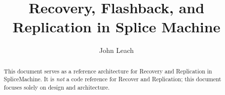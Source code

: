 \documentclass[10pt]{amsart}
\begin{document}
\title{Recovery, Flashback, and Replication in Splice Machine }
\author{John Leach}

\begin{abstract}
This document serves as a reference architecture for Recovery and Replication in
SpliceMachine.  It is \emph{not} a
code reference for Recover and Replication; this document focuses solely on
design and architecture.
\end{abstract}

\maketitle


\end{document}
